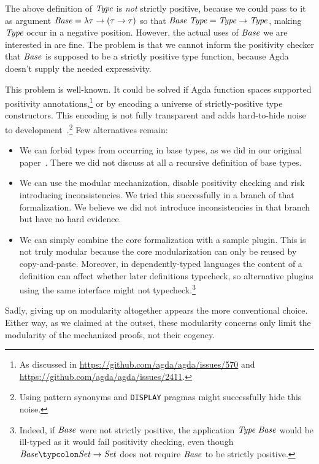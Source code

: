 The above definition of \ensuremath{\Conid{Type}} is \emph{not} strictly positive,
because we could pass to it as argument \ensuremath{\Conid{Base}\mathrel{=}\lambda \tau\to (\tau\to \tau)} so that \ensuremath{\Conid{Base}\;\Conid{Type}\mathrel{=}\Conid{Type}\to \Conid{Type}}, making \ensuremath{\Conid{Type}} occur in
a negative position. However, the actual uses of \ensuremath{\Conid{Base}} we are
interested in are fine. The problem is that we cannot inform the
positivity checker that \ensuremath{\Conid{Base}} is supposed to be a strictly
positive type function, because Agda doesn't supply the needed
expressivity.

This problem is well-known. It could be solved if Agda function spaces supported
positivity annotations,\footnote{As discussed in
  \url{https://github.com/agda/agda/issues/570} and
  \url{https://github.com/agda/agda/issues/2411}.} or by encoding a universe of
strictly-positive type constructors. This encoding is not fully transparent and
adds hard-to-hide noise to
development~\citep{Schwaab2013modular}.\footnote{Using pattern synonyms and
  \texttt{DISPLAY} pragmas might successfully hide this noise.}
Few alternatives remain:
\begin{itemize}
\item We can forbid types from occurring in base types, as we did in our
  original paper~\citep{CaiEtAl2014ILC}. There we did not discuss at all a
  recursive definition of base types.
\item We can use the modular mechanization, disable positivity checking and risk
  introducing inconsistencies. We tried this successfully in a branch of that
  formalization. We believe we did not introduce inconsistencies in that branch
  but have no hard evidence.
\item We can simply combine the core formalization with a sample plugin. This is
  not truly modular because the core modularization can only be reused by
  copy-and-paste. Moreover, in dependently-typed languages the content of a
  definition can affect whether later definitions typecheck, so alternative
  plugins using the same interface might not typecheck.\footnote{Indeed, if
    \ensuremath{\Conid{Base}} were not strictly positive, the application \ensuremath{\Conid{Type}\;\Conid{Base}} would be
    ill-typed as it would fail positivity checking, even though \ensuremath{\Conid{Base}\typcolon\Conid{Set}\to \Conid{Set}} does not require \ensuremath{\Conid{Base}} to be strictly positive.}
\end{itemize}

Sadly, giving up on modularity altogether appears the more conventional choice.
Either way, as we claimed at the outset, these modularity concerns only limit
the modularity of the mechanized proofs, not their cogency.
